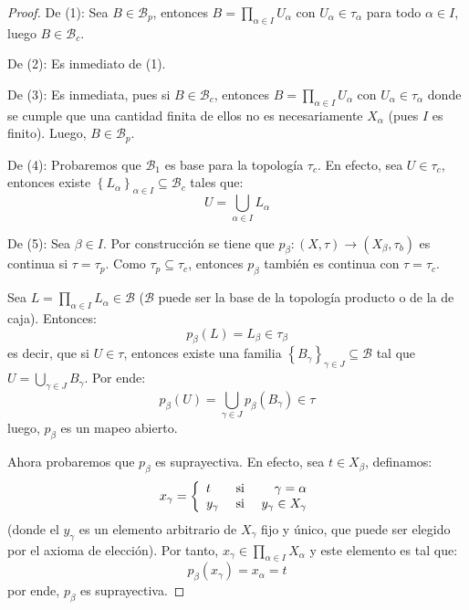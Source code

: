 \documentclass[12pt]{report}
\theoremstyle{largebreak}
\newcommand\cf[3]{\ensuremath{#1:#2\rightarrow#3}}
\begin{document}
    \begin{proof}
        De (1): Sea $B\in\mathcal{B}_p$, entonces $B=\prod_{\alpha\in I}U_\alpha$ con $U_\alpha\in\tau_\alpha$ para todo $\alpha\in I$, luego $B\in\mathcal{B}_c$.

        De (2): Es inmediato de (1).

        De (3): Es inmediata, pues si $B\in\mathcal{B}_c$, entonces $B=\prod_{\alpha\in I}U_\alpha$ con $U_\alpha\in\tau_\alpha$ donde se cumple que una cantidad finita de ellos no es necesariamente $X_\alpha$ (pues $I$ es finito). Luego, $B\in\mathcal{B}_p$.

        De (4): Probaremos que $\mathcal{B}_1$ es base para la topología $\tau_c$. En efecto, sea $U\in\tau_c$, entonces existe $\left\{L_\alpha \right\}_{\alpha\in I}\subseteq\mathcal{B}_c$ tales que:
        \begin{equation*}
            U=\bigcup_{\alpha\in I}L_\alpha
        \end{equation*}

        De (5): Sea $\beta\in I$. Por construcción se tiene que $\cf{p_\beta}{(X,\tau)}{(X_\beta,\tau_b)}$ es continua si $\tau=\tau_p$. Como $\tau_p\subseteq\tau_c$, entonces $p_\beta$ también es continua con $\tau=\tau_c$.

        Sea $L=\prod_{\alpha\in I}L_\alpha\in\mathcal{B}$ ($\mathcal{B}$ puede ser la base de la topología producto o de la de caja). Entonces:
        \begin{equation}
            p_\beta(L)=L_\beta\in\tau_\beta
        \end{equation}
        es decir, que si $U\in\tau$, entonces existe una familia $\left\{B_\gamma \right\}_{\gamma\in J}\subseteq\mathcal{B}$ tal que $U=\bigcup_{\gamma\in J}B_\gamma$. Por ende:
        \begin{equation*}
            p_{\beta}(U)=\bigcup_{\gamma\in J}p_\beta(B_\gamma)\in\tau
        \end{equation*}
        luego, $p_\beta$ es un mapeo abierto.

        Ahora probaremos que $p_\beta$ es suprayectiva. En efecto, sea $t\in X_\beta$, definamos:
        \begin{equation*}
            x_\gamma=\left\{
                \begin{array}{lcr}
                    t & \textup{ si } & \gamma=\alpha\\
                    y_\gamma & \textup{ si } & y_\gamma\in X_\gamma\\
                \end{array}
            \right.
        \end{equation*}
        (donde el $y_\gamma$ es un elemento arbitrario de $X_\gamma$ fijo y único, que puede ser elegido por el axioma de elección). Por tanto, $x_\gamma\in\prod_{\alpha\in I}X_\alpha$ y este elemento es tal que:
        \begin{equation*}
            p_\beta(x_\gamma)=x_\alpha=t
        \end{equation*}
        por ende, $p_\beta$ es suprayectiva.


\end{proof}
\end{document}
